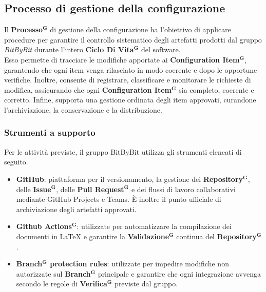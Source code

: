 \documentclass[a4paper,12pt]{article}
\newcommand{\term}[1]{\textbf{#1}$^\mathbf{G}$}
\begin{document}
\subsection{Processo di gestione della configurazione}
Il \term{Processo} di gestione della configurazione ha l’obiettivo di applicare procedure per garantire il controllo sistematico degli artefatti prodotti dal gruppo \textit{BitByBit} durante l’intero \term{Ciclo Di Vita} del software. \\
Esso permette di tracciare le modifiche apportate ai \term{Configuration Item}, garantendo che ogni item venga rilasciato in modo coerente e dopo le opportune verifiche. Inoltre, consente di registrare, classificare e monitorare le richieste di modifica, assicurando che ogni \term{Configuration Item} sia completo, coerente e corretto. 
Infine, supporta una gestione ordinata degli item approvati, curandone l’archiviazione, la conservazione e la distribuzione.

\subsubsection{Strumenti a supporto}
Per le attività previste, il gruppo BitByBit utilizza gli strumenti elencati di seguito.
\begin{itemize}
    \item \textbf{GitHub}: piattaforma per il versionamento, la gestione dei \term{Repository}, delle \term{Issue}, delle \term{Pull Request} e dei flussi di lavoro collaborativi mediante GitHub Projects e Teams. È inoltre il punto ufficiale di archiviazione degli artefatti approvati.
    \item \textbf{\term{Github Actions}}: utilizzate per automatizzare la compilazione dei documenti in \LaTeX{} e garantire la \term{Validazione} continua del \term{Repository}.
    \item \textbf{\term{Branch} protection rules}: utilizzate per impedire modifiche non autorizzate sul \term{Branch} principale e garantire che ogni integrazione avvenga secondo le regole di \term{Verifica} previste dal gruppo.
\end{itemize}
\end{document}

